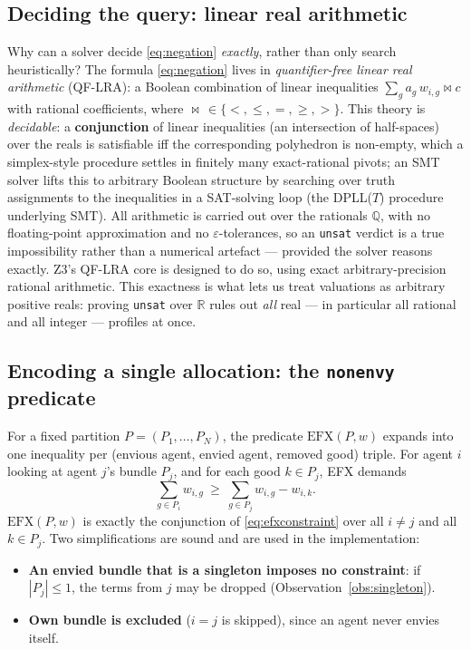 \documentclass[11pt,a4paper]{article}
\theoremstyle{definition}
\theoremstyle{plain}
\newcommand{\EFX}{\textsf{EFX}}
\newcommand{\agents}{N}
\begin{document}
\subsection{Deciding the query: linear real arithmetic}
\label{sec:lra}

Why can a solver decide \eqref{eq:negation} \emph{exactly}, rather than only
search heuristically? The formula \eqref{eq:negation} lives in \emph{quantifier-free
linear real arithmetic} (QF-LRA): a Boolean combination of linear inequalities
$\sum_g a_g\,w_{i,g}\bowtie c$ with rational coefficients, where
$\bowtie\,\in\{<,\leq,=,\geq,>\}$. This theory is \emph{decidable}: a
\textbf{conjunction} of linear inequalities (an intersection of half-spaces) over
the reals is satisfiable iff the corresponding polyhedron is non-empty, which a
simplex-style procedure settles in finitely many exact-rational pivots; an SMT
solver lifts this to arbitrary Boolean structure by searching over truth
assignments to the inequalities in a SAT-solving loop (the DPLL($T$) procedure
underlying SMT). All arithmetic is carried out over the rationals $\mathbb{Q}$,
with no floating-point approximation and no $\varepsilon$-tolerances, so an
\texttt{unsat} verdict is a true impossibility rather than a numerical
artefact --- provided the solver reasons exactly. Z3's QF-LRA core is designed to do so, using
exact arbitrary-precision rational arithmetic. This exactness is what lets us treat valuations as
arbitrary positive reals: proving \texttt{unsat} over $\mathbb{R}$ rules out
\emph{all} real --- in particular all rational and all integer --- profiles at
once.

\subsection{Encoding a single allocation: the \texttt{nonenvy} predicate}

For a fixed partition $P=(P_1,\dots,P_\agents)$, the predicate
$\mathrm{EFX}(P,w)$ expands into one inequality per (envious agent, envied agent,
removed good) triple. For agent $i$ looking at agent $j$'s bundle $P_j$, and for
each good $k\in P_j$, \EFX{} demands
\begin{equation}
  \sum_{g\in P_i} w_{i,g}\ \geq\ \sum_{g\in P_j} w_{i,g} - w_{i,k}.
  \label{eq:efxconstraint}
\end{equation}
$\mathrm{EFX}(P,w)$ is exactly the conjunction of \eqref{eq:efxconstraint} over all
$i\neq j$ and all $k\in P_j$. Two simplifications are sound and are used in the
implementation:
\begin{itemize}
  \item \textbf{An envied bundle that is a singleton imposes no constraint}: if
        $|P_j|\leq 1$, the terms from $j$ may be dropped
        (Observation~\ref{obs:singleton}).
  \item \textbf{Own bundle is excluded} ($i=j$ is skipped), since an agent never
        envies itself.
\end{itemize}
\end{document}
